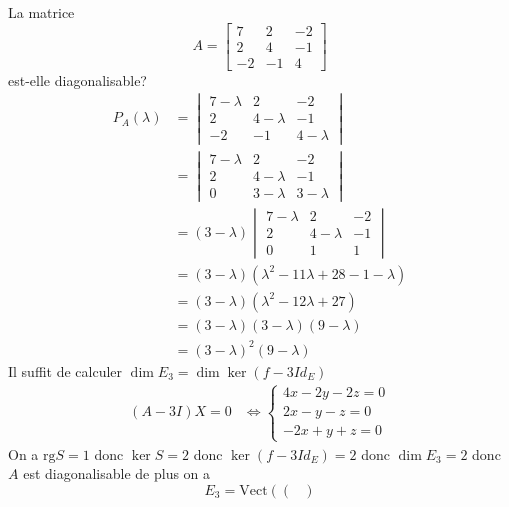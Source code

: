 \documentclass[11pt,colorlinks]{book}
\theoremstyle{mytheoremstyle}
\theoremstyle{mytheoremstyle}
\theoremstyle{mytheoremstyle}
\theoremstyle{mytheoremstyle}
\theoremstyle{mytheoremstyle}
\theoremstyle{mytheoremstyle}
\theoremstyle{mytheoremstyle}
\theoremstyle{mytheoremstyle}
\theoremstyle{myproblemstyle}
\begin{document}
\begin{ex}
  La matrice 
  \begin{equation*}
    A = \begin{bmatrix}
      7 & 2 & -2 \\ 
      2 & 4 & -1 \\ 
      -2 & -1 & 4
    \end{bmatrix}
  \end{equation*}
  est-elle diagonalisable?
  \begin{align*}
    P_A(\lambda) &= \begin{vmatrix}
      7-\lambda & 2 & -2 \\ 
      2 & 4-\lambda & -1 \\ 
      -2 & -1 & 4 - \lambda
    \end{vmatrix} \\ 
    &= \begin{vmatrix}
      7 - \lambda & 2 & -2 \\ 
      2 & 4 - \lambda & -1 \\ 
      0 & 3 - \lambda & 3 - \lambda 
    \end{vmatrix} \\ 
    &= (3-\lambda) \begin{vmatrix}
      7-\lambda & 2 & -2 \\ 
      2 & 4-\lambda & -1 \\ 
      0 & 1 & 1
    \end{vmatrix} \\ 
    &= (3-\lambda) (\lambda^2 - 11\lambda + 28 - 1 - \lambda) \\ 
    &= (3-\lambda) (\lambda^2 - 12\lambda + 27) \\ 
    &= (3-\lambda) (3-\lambda) (9-\lambda) \\ 
    &= (3-\lambda)^2 (9-\lambda)
  \end{align*}
  Il suffit de calculer $\dim E_3 = \dim \ker (f-3Id_E)$
  \begin{align*}
    (A-3I)X = 0 &\Leftrightarrow \begin{cases}
      4x - 2y - 2z = 0 \\ 
      2x - y - z = 0 \\ 
      -2x +y +z = 0
    \end{cases}
  \end{align*}
  On a $\text{rg} S = 1$ donc $\ker S = 2$ donc $\ker (f-3Id_E) = 2$ donc $\dim E_3 = 2$ donc $A$ est diagonalisable de plus on a 
  \begin{equation*}
    E_3 = \text{Vect}\left(\begin{pmatrix}

\end{pmatrix}
\end{equation*}
\end{ex}
\end{document}
